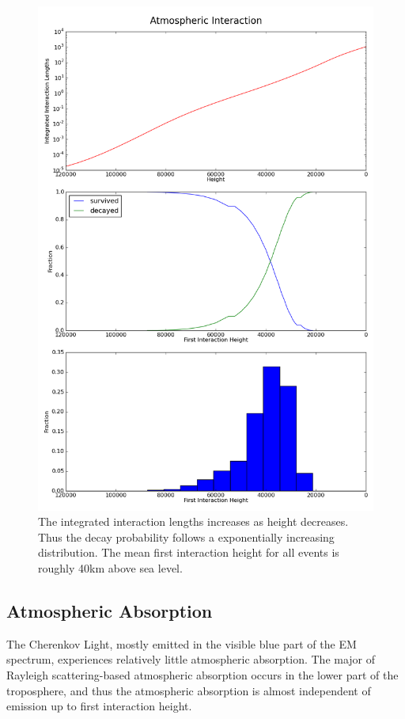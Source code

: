 \documentclass{article}
\begin{document}
\begin{figure}
\begin{center}
\includegraphics[height=0.9\textheight]{generalheight}
\caption{The integrated interaction lengths increases as height decreases. Thus the decay probability follows a exponentially increasing distribution. The mean first interaction height for all events is roughly 40km above sea level.}
\label{fig:generalheight}
\end{center}
\end{figure}

\subsection{Atmospheric Absorption}
The Cherenkov Light, mostly emitted in the visible blue part of the EM spectrum, experiences relatively little atmospheric absorption. The major of Rayleigh scattering-based atmospheric absorption occurs in the lower part of the troposphere, and thus the atmospheric absorption is almost independent of emission up to first interaction height.
\end{document}
